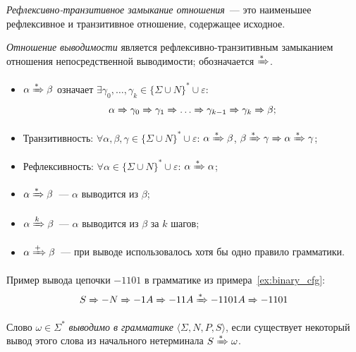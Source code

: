 \begin{definition}
    \emph{Рефлексивно-транзитивное замыкание отношения}~--- это наименьшее рефлексивное и транзитивное отношение, содержащее исходное.
\end{definition}

\begin{definition}
    \emph{Отношение выводимости} является рефлексивно-транзитивным замыканием отношения непосредственной выводимости; обозначается $\derives$.
    \begin{itemize}
        \item $\alpha \derives \beta$ означает $\exists \gamma_0, \dots, \gamma_k \in \{\Sigma \cup N\}^* \cup {\varepsilon}$:
              \[ \alpha \derives[] \gamma_0 \derives[] \gamma_1 \derives[] \dots \derives[] \gamma_{k-1} \derives[] \gamma_{k} \derives[] \beta;\]
        \item Транзитивность: $\forall \alpha, \beta, \gamma \in \{\Sigma \cup N\}^* \cup {\varepsilon}$: $\alpha \derives \beta$, $\beta \derives \gamma \derives[] \alpha \derives \gamma$;
        \item Рефлексивность: $\forall \alpha \in \{\Sigma \cup N\}^* \cup {\varepsilon}$: $\alpha \derives \alpha$;
        \item $\alpha \derives \beta$~--- $\alpha$ выводится из $\beta$;
        \item $\alpha \derives[k] \beta$~--- $\alpha$ выводится из $\beta$ за $k$ шагов;
        \item $\alpha \derives[+] \beta$~--- при выводе использовалось хотя бы одно правило грамматики.
    \end{itemize}
\end{definition}

\begin{example}
    Пример вывода цепочки $-1101$ в грамматике из примера~\ref{ex:binary_cfg}:
    \[
        S \derives[] - N \derives[] - 1 A \derives[] - 1 1 A \derives - 1 1 0 1 A \derives[] - 1 1 0 1
    \]
\end{example}

\begin{definition}
    Слово $\omega \in \Sigma^*$ \emph{выводимо в грамматике} $\langle \Sigma, N, P, S \rangle$, если существует некоторый вывод этого слова из начального нетерминала $S \derives \omega$.

\end{definition}

